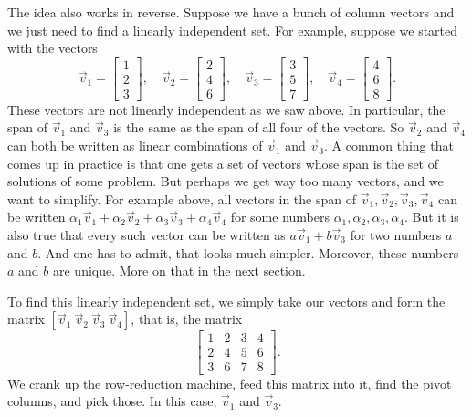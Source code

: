 The idea also works in reverse.  Suppose we have a bunch of column vectors
and we just need to find a linearly independent set.  For example, suppose
we started with the vectors
\begin{equation*}
\vec{v}_1 =
\begin{bmatrix}
1 \\
2 \\
3
\end{bmatrix}
,
\quad
\vec{v}_2 =
\begin{bmatrix}
2 \\
4 \\
6
\end{bmatrix}
,
\quad
\vec{v}_3 =
\begin{bmatrix}
3 \\
5 \\
7
\end{bmatrix}
,
\quad
\vec{v}_4 =
\begin{bmatrix}
4 \\
6 \\
8
\end{bmatrix} .
\end{equation*}
These vectors are not linearly independent as we saw above.  In particular,
the span of $\vec{v}_1$ and $\vec{v}_3$ is the same as
the span of all four of the vectors.  So $\vec{v}_2$ and $\vec{v}_4$
can both be written as linear combinations of $\vec{v}_1$ and $\vec{v}_3$.
A common thing that comes up in practice is that one gets a set of vectors
whose span is the set of solutions of some problem.  But perhaps we get way
too many vectors, and we want to simplify.  For example above, all vectors in
the span of
$\vec{v}_1, \vec{v}_2, \vec{v}_3, \vec{v}_4$ can be written
$\alpha_1 \vec{v}_1 + \alpha_2 \vec{v}_2 + \alpha_3 \vec{v}_3 + \alpha_4
\vec{v}_4$ for some numbers $\alpha_1,\alpha_2,\alpha_3,\alpha_4$.  But
it is also true that every such vector can be written as
$a \vec{v}_1 + b \vec{v}_3$ for two numbers $a$ and $b$.  And one has to
admit, that looks much simpler.  Moreover, these numbers $a$ and $b$ are
unique.  More on that in the next section.

To find this linearly independent set, we simply take our vectors
and form the matrix $[ \vec{v}_1 ~ \vec{v}_2 ~ \vec{v}_3 ~ \vec{v}_4 ]$,
that is, the matrix
\begin{equation*}
\begin{bmatrix}
1 & 2 & 3 & 4 \\
2 & 4 & 5 & 6 \\
3 & 6 & 7 & 8
\end{bmatrix} .
\end{equation*}
We crank up the row-reduction machine, feed this matrix into it, find
the pivot columns, and pick those.  In this case, $\vec{v}_1$ and
$\vec{v}_3$.

